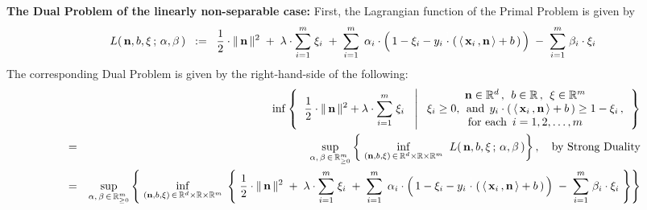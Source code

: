 \vskip 0.5cm
\noindent
\textbf{The Dual Problem of the linearly non-separable case:}
\vskip 0.1cm
\noindent
First, the Lagrangian function of the Primal Problem is given by
\begin{equation*}
L(\,\mathbf{n},b,\xi\,;\,\alpha,\beta\,)
\;\; := \;\;
	\dfrac{1}{2}\cdot\Vert\,\mathbf{n}\,\Vert^{2}
	\; + \;
	\lambda\cdot\overset{m}{\underset{i=1}{\sum}}\;\xi_{i}
	\; + \;
	\overset{m}{\underset{i = 1}{\sum}}\;\,
		\alpha_{i}
		\cdot
		\left(\,
			1 - \xi_{i}
			-
			y_{i}\overset{{\color{white}1}}{\cdot}\left(\,
				\langle\,\mathbf{x}_{i}\,,\mathbf{n}\,\rangle + b
				\,\right)
			\,\right)
	\; - \;
	\overset{m}{\underset{i = 1}{\sum}}\;
		\beta_{i}
		\cdot
		\xi_{i}
\end{equation*}
The corresponding Dual Problem is given by the right-hand-side of the following:
\begin{eqnarray*}
&&
	\inf
	\left\{\;\;
		\dfrac{1}{2}\cdot\Vert\,\mathbf{n}\,\Vert^{2}
		+
		\lambda\cdot\overset{m}{\underset{i=1}{\sum}}\;\xi_{i}
		\;\;\,\left\vert\;
		\begin{array}{c}
			\mathbf{n} \in \Re^{d} \,,\;\, b \in \Re \,,\;\, \xi \in \Re^{m}
			\\
			\xi_{i} \geq 0,\;\,\textnormal{and}\;\,
			y_{i}\cdot\left(\,\langle\,\mathbf{x}_{i}\,,\mathbf{n}\,\rangle + b\,\right) \geq 1 - \xi_{i}\,,
			\\
			\textnormal{for each \,$i = 1,2,\ldots,m$}
			\end{array}
			\right.
		\right\}
\\
& = &
	\underset{\alpha,\,\beta\,\in\,\Re_{\geq 0}^{m}}{\sup}
	\left\{\;
		\underset{(\mathbf{n},b,\xi)\,\in\,\Re^{d}\times\Re\times\Re^{m}}{\inf}\;\;
		L(\,\mathbf{n},b,\xi\,;\,\alpha,\beta\,)
		\right\},
	\quad
	\textnormal{by Strong Duality}
\\
& = &
	\underset{\alpha,\,\beta\,\in\,\Re_{\geq 0}^{m}}{\sup}
	\left\{\;
		\underset{(\mathbf{n},b,\xi)\,\in\,\Re^{d}\times\Re\times\Re^{m}}{\inf}\;
		\left\{\;
			\dfrac{1}{2}\cdot\Vert\,\mathbf{n}\,\Vert^{2}
			\; + \;
			\lambda\cdot\overset{m}{\underset{i=1}{\sum}}\;\xi_{i}
			\; + \;
			\overset{m}{\underset{i = 1}{\sum}}\;\,
				\alpha_{i}
				\cdot
				\left(\,
					1 - \xi_{i}
					-
					y_{i}\overset{{\color{white}1}}{\cdot}\left(\,
						\langle\,\mathbf{x}_{i}\,,\mathbf{n}\,\rangle + b
						\,\right)
					\,\right)
			\; - \;
			\overset{m}{\underset{i = 1}{\sum}}\;
				\beta_{i}
				\cdot
				\xi_{i}
			\;\right\}
		\right\}
\end{eqnarray*}

